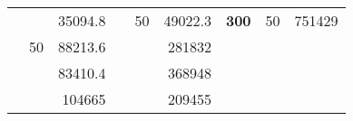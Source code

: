 \begin{table}[]
\begin{tabular}{|ccrccrccr}
\rowcolor[HTML]{DDFDFF} 
\multicolumn{1}{|c|}{\cellcolor[HTML]{FFFFC7}}                                & \multicolumn{1}{c|}{\cellcolor[HTML]{DDFDFF}}                      & \multicolumn{1}{r|}{\cellcolor[HTML]{DAE8FC}35094.8}   & \multicolumn{1}{c|}{\cellcolor[HTML]{FFFFC7}}                                & \multicolumn{1}{c|}{\multirow{-10}{*}{\cellcolor[HTML]{DDFDFF}50}}  & \multicolumn{1}{r|}{\cellcolor[HTML]{DDFDFF}49022.3}   & \multicolumn{1}{c|}{\multirow{-19}{*}{\cellcolor[HTML]{FFFFC7}\textbf{300}}} & \multicolumn{1}{c|}{\multirow{-10}{*}{\cellcolor[HTML]{DDFDFF}50}} & \multicolumn{1}{r|}{\cellcolor[HTML]{DDFDFF}751429}    \\ \cline{3-3} \cline{5-9} 
\multicolumn{1}{|c|}{\cellcolor[HTML]{FFFFC7}}                                & \multicolumn{1}{c|}{\multirow{-10}{*}{\cellcolor[HTML]{DDFDFF}50}} & \multicolumn{1}{r|}{\cellcolor[HTML]{DDFDFF}88213.6}   & \multicolumn{1}{c|}{\cellcolor[HTML]{FFFFC7}}                                & \multicolumn{1}{c|}{\cellcolor[HTML]{DAE8FC}}                       & \multicolumn{1}{r|}{\cellcolor[HTML]{DAE8FC}281832}    &                                                                              &                                                                    &                                                        \\ \cline{2-3} \cline{6-6}
\multicolumn{1}{|c|}{\cellcolor[HTML]{FFFFC7}}                                & \multicolumn{1}{c|}{\cellcolor[HTML]{DAE8FC}}                      & \multicolumn{1}{r|}{\cellcolor[HTML]{DAE8FC}83410.4}   & \multicolumn{1}{c|}{\cellcolor[HTML]{FFFFC7}}                                & \multicolumn{1}{c|}{\cellcolor[HTML]{DAE8FC}}                       & \multicolumn{1}{r|}{\cellcolor[HTML]{DDFDFF}368948}    &                                                                              &                                                                    &                                                        \\ \cline{3-3} \cline{6-6}
\multicolumn{1}{|c|}{\cellcolor[HTML]{FFFFC7}}                                & \multicolumn{1}{c|}{\cellcolor[HTML]{DAE8FC}}                      & \multicolumn{1}{r|}{\cellcolor[HTML]{DDFDFF}104665}    & \multicolumn{1}{c|}{\cellcolor[HTML]{FFFFC7}}                                & \multicolumn{1}{c|}{\cellcolor[HTML]{DAE8FC}}                       & \multicolumn{1}{r|}{\cellcolor[HTML]{DAE8FC}209455}    &                                                                              &                                                                    &                                                        \\ \cline{3-3} \cline{6-6}

\end{tabular}
\end{table}
